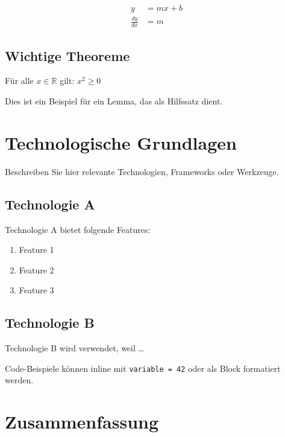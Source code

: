 \begin{align}
    y &= mx + b \\
    \frac{dy}{dx} &= m
\end{align}

\subsection{Wichtige Theoreme}

\begin{satz}[Beispielsatz]
    \label{satz:beispiel}
    Für alle $x \in \mathbb{R}$ gilt: $x^2 \geq 0$
\end{satz}

\begin{lemma}
    \label{lemma:beispiel}
    Dies ist ein Beispiel für ein Lemma, das als Hilfssatz dient.
\end{lemma}

\section{Technologische Grundlagen}
\label{sec:technologie}

Beschreiben Sie hier relevante Technologien, Frameworks oder Werkzeuge.

\subsection{Technologie A}

Technologie A bietet folgende Features:
\begin{enumerate}
    \item Feature 1
    \item Feature 2
    \item Feature 3
\end{enumerate}

\subsection{Technologie B}

Technologie B wird verwendet, weil \dots

Code-Beispiele können inline mit \texttt{variable = 42} oder als Block formatiert werden.

\section{Zusammenfassung}
\label{sec:grundlagen-zusammenfassung}

